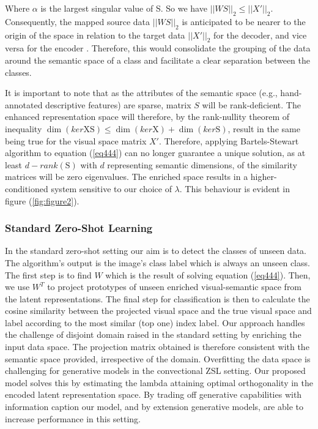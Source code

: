 \documentclass{article}
\begin{document}
Where $\alpha$ is the largest singular value of S. So we have $||WS||_2 \leq ||X'||_2$. Consequently,  the mapped source data $||WS||_2$ is anticipated to be nearer to the origin of the space in relation to the target data $||X'||_2$ for the decoder, and vice versa for the encoder \cite{b28}. Therefore, this would consolidate the grouping of the data around the semantic space of a class and facilitate a clear separation between the classes. 
\par It is important to note that as the attributes of the semantic space (e.g., hand-annotated descriptive features) are sparse, matrix $S$ will be rank-deficient. The enhanced representation space will therefore, by the rank-nullity theorem of inequality $\dim (ker \mathrm{XS}) \leq  \dim (ker \mathrm{X}) + \dim(ker \mathrm{S}) $, result in the same being true for the visual space matrix $X'$. Therefore, applying Bartels-Stewart algorithm \cite{b50} to equation (\ref{eq444}) can no longer guarantee a unique solution, as at least $\mathrm{\textit{d}}-rank (\mathrm{S})$ with $d$ representing semantic dimensions, of the similarity matrices will be zero eigenvalues. The enriched space results in a higher-conditioned system sensitive to our choice of $\lambda$. This behaviour is evident in figure (\ref{fig:figure2}).

\subsubsection{Standard Zero-Shot Learning}
In the standard zero-shot setting our aim is to detect the classes of unseen data. The algorithm's output is the image's class label which is always an unseen class. The first step is to find $W$ which is the result of solving equation (\ref{eq444}). Then, we use $W^T$ to project prototypes of unseen enriched visual-semantic space from the latent representations. The final step for classification is then to calculate the cosine similarity between the projected visual space and the true visual space and label according to the most similar (top one) index label. Our approach handles the challenge of disjoint domain raised in the standard setting by enriching the input data space. The projection matrix obtained is therefore consistent with the semantic space provided, irrespective of the domain. Overfitting the data space is challenging for generative models in the convectional ZSL setting. Our proposed model solves this by estimating the lambda attaining optimal orthogonality in the encoded latent representation space. By trading off generative capabilities with information caption our model, and by extension generative models, are able to increase performance in this setting.
\end{document}

